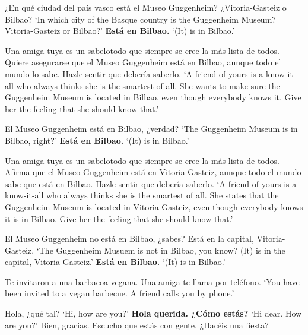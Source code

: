 \begin{exe}
	\begin{xlist}[A:]
	 ¿En qué ciudad del país vasco está el Museo Guggenheim? ¿Vitoria-Gasteiz o Bilbao? \href{https://osf.io/h23ce/}{\faVolumeUp}
	\glt `In which city of the Basque country is the Guggenheim Museum? Vitoria-Gasteiz or Bilbao?' 
	 \textbf{Está en Bilbao.} 
	\glt `(It) is in Bilbao.' 
	\end{xlist}
\largerpage
\ex \label{ex:experimentoOBVCONFbilbao_APP}
	Una amiga tuya es un sabelotodo que siempre se cree la más lista de todos. Quiere asegurarse que el Museo Guggenheim está en Bilbao, aunque todo el mundo lo sabe. Hazle sentir que debería saberlo. 
	\pagebreak\glt `A friend of yours is a know-it-all who always thinks she is the smartest of all. She wants to make sure the Guggenheim Museum is located in Bilbao, even though everybody knows it. Give her the feeling that she should know that.' 
	\begin{xlist}[A:]
	 El Museo Guggenheim está en Bilbao, ¿verdad? \href{https://osf.io/rk4ue/}{\faVolumeUp}
	\glt `The Guggenheim Museum is in Bilbao, right?' 
	 \textbf{Está en Bilbao.} 
	\glt `(It) is in Bilbao.' 
	\end{xlist}
\ex \label{ex:experimentoOBVDENbilbao_APP}
	Una amiga tuya es un sabelotodo que siempre se cree la más lista de todos. Afirma que el Museo Guggenheim está en Vitoria-Gasteiz, aunque todo el mundo sabe que está en Bilbao. Hazle sentir que debería saberlo. 
	\glt `A friend of yours is a know-it-all who always thinks she is the smartest of all. She states that the Guggenheim Museum is located in Vitoria-Gasteiz, even though everybody knows it is in Bilbao. Give her the feeling that she should know that.' 
	\begin{xlist}[A:]
	 El Museo Guggenheim no está en Bilbao, ¿sabes? Está en la capital, Vitoria-Gasteiz. \href{https://osf.io/x3jse/}{\faVolumeUp}
	\glt `The Guggenheim Musuem is not in Bilbao, you know? (It) is in the capital, Vitoria-Gasteiz.' 
	 \textbf{Está en Bilbao.} 
	\glt `(It) is in Bilbao.' 
	\end{xlist}
\ex \label{ex:experimentoNEUTRALDECLvegana_APP}
	Te invitaron a una barbacoa vegana. Una amiga te llama por teléfono. 
	\glt `You have been invited to a vegan barbecue. A friend calls you by phone.' 
	\begin{xlist}[A:]
	 Hola, ¿qué tal? \href{https://osf.io/pgj25/}{\faVolumeUp}
	\glt `Hi, how are you?' 
	 \textbf{Hola querida. ¿Cómo estás?} 
	\glt `Hi dear. How are you?' 
	 Bien, gracias. Escucho que estás con gente. ¿Hacéis una fiesta? \href{https://osf.io/cx62t/}{\faVolumeUp}

\end{xlist}
\end{exe}
